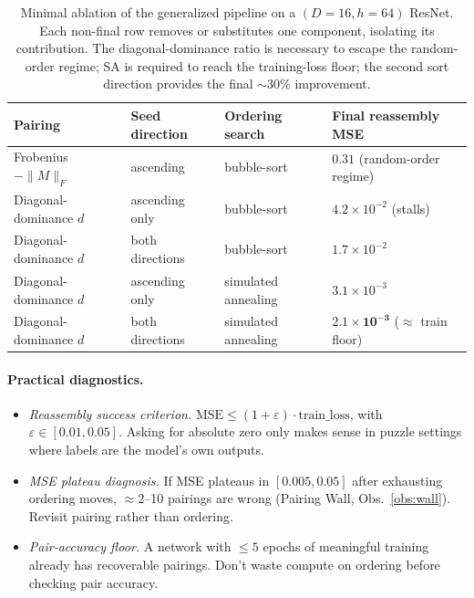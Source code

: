 \documentclass[10pt]{article}
\theoremstyle{remark}
\begin{document}
\begin{table}[H]
\centering
\small
\renewcommand{\arraystretch}{1.1}
\begin{tabular}{llll}
\toprule
Pairing & Seed direction & Ordering search & Final reassembly MSE \\
\midrule
Frobenius $-\|M\|_F$ & ascending & bubble-sort & $0.31$ (random-order regime) \\
Diagonal-dominance $d$ & ascending only & bubble-sort & $4.2\times 10^{-2}$ (stalls) \\
Diagonal-dominance $d$ & both directions & bubble-sort & $1.7\times 10^{-2}$ \\
Diagonal-dominance $d$ & ascending only & simulated annealing & $3.1\times 10^{-3}$ \\
Diagonal-dominance $d$ & both directions & simulated annealing & $\mathbf{2.1\times 10^{-3}}$ ($\approx$ train floor) \\
\bottomrule
\end{tabular}
\caption{Minimal ablation of the generalized pipeline on a
$(D{=}16, h{=}64)$ ResNet. Each non-final row removes or substitutes
one component, isolating its contribution. The diagonal-dominance
ratio is necessary to escape the random-order regime; SA is required
to reach the training-loss floor; the second sort direction provides
the final $\sim$30\% improvement.}
\label{tab:ablation}
\end{table}

\paragraph{Practical diagnostics.}
\begin{itemize}[leftmargin=*,itemsep=0pt]
  \item \emph{Reassembly success criterion.}
        $\mathrm{MSE} \leq (1{+}\varepsilon) \cdot \mathrm{train\_loss}$,
        with $\varepsilon \in [0.01, 0.05]$. Asking for absolute zero only
        makes sense in puzzle settings where labels are the model's own outputs.
  \item \emph{MSE plateau diagnosis.} If MSE plateaus in $[0.005, 0.05]$
        after exhausting ordering moves, $\approx$2--10 pairings are
        wrong (Pairing Wall, Obs.~\ref{obs:wall}). Revisit pairing
        rather than ordering.
  \item \emph{Pair-accuracy floor.} A network with $\leq 5$ epochs of
        meaningful training already has recoverable pairings. Don't
        waste compute on ordering before checking pair accuracy.
\end{itemize}
\end{document}
